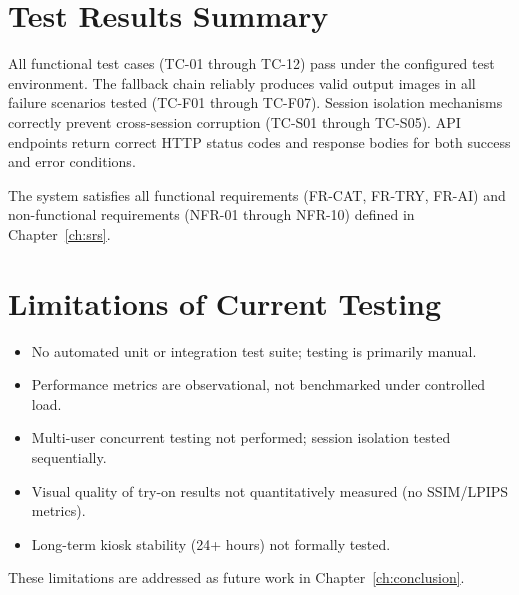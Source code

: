 \section{Test Results Summary}
\label{sec:test-summary}

All functional test cases (TC-01 through TC-12) pass under the configured test environment. The fallback chain reliably produces valid output images in all failure scenarios tested (TC-F01 through TC-F07). Session isolation mechanisms correctly prevent cross-session corruption (TC-S01 through TC-S05). API endpoints return correct HTTP status codes and response bodies for both success and error conditions.

The system satisfies all functional requirements (FR-CAT, FR-TRY, FR-AI) and non-functional requirements (NFR-01 through NFR-10) defined in Chapter~\ref{ch:srs}.

\section{Limitations of Current Testing}
\label{sec:testing-limitations}

\begin{itemize}[leftmargin=*]
  \item No automated unit or integration test suite; testing is primarily manual.
  \item Performance metrics are observational, not benchmarked under controlled load.
  \item Multi-user concurrent testing not performed; session isolation tested sequentially.
  \item Visual quality of try-on results not quantitatively measured (no SSIM/LPIPS metrics).
  \item Long-term kiosk stability (24+ hours) not formally tested.
\end{itemize}

These limitations are addressed as future work in Chapter~\ref{ch:conclusion}.
